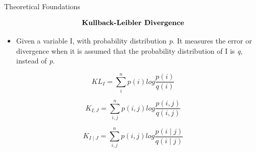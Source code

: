 \begin{frame}[allowframebreaks]{{Theoretical Foundations}}

\begin{align*}
   \centering \textbf{Kullback-Leibler Divergence}
\end{align*}

\begin{itemize}
    \item Given  a variable I, with probability distribution \textit{p}. It measures the error or divergence when it is assumed that the probability distribution of I is \textit{q}, instead of \textit{p}.
\end{itemize}

\begin{equation}
\label{eq:kullback}   
    KL_{I} = \sum_{i}^{n}p(i)log \frac{p(i)}{q(i)}
\end{equation}

\begin{equation}
\label{eq:kullback_joint}   
    K_{I, J} = \sum_{i,j}^{n}p(i,j)log \frac{p(i,j)}{q(i,j)}
\end{equation}


\begin{equation}
\label{eq:kullback_cond}   
    K_{I \mid J} = \sum_{i,j}^{n}p(i,j)log \frac{p(i\mid j)}{q(i \mid j)}
\end{equation}


\end{frame}





